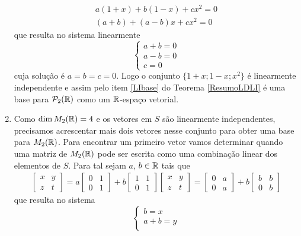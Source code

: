 \begin{exemplos}
\begin{exemplos}
\begin{solucao}
\begin{enumerate}
        \begin{align*}
          a(1 + x) + b(1 - x) + cx^2 = 0\\
          (a + b) + (a - b)x + cx^2 = 0
        \end{align*}
        que resulta no sistema linearmente
        \[
          \begin{cases}
            a + b = 0\\
            a - b = 0\\
            c = 0
          \end{cases}
        \]
        cuja solução é $a = b = c = 0$. Logo o conjunto $\{1 + x; 1 - x; x^2\}$ é linearmente independente e assim pelo item \ref{LIbase} do Teorema \ref{ResumoLDLI} é uma base para $\mathcal{P}_2(\mathbb{R})$ como um $\mathbb{R}$-espaço vetorial.

      \item Como $\dim M_2(\mathbb{R}) = 4$ e os vetores em $S$ são linearmente independentes, precisamos acrescentar mais dois vetores nesse conjunto para obter uma base para $M_2(\mathbb{R})$. Para encontrar um primeiro vetor vamos determinar quando uma matriz de $M_2(\mathbb{R})$ pode ser escrita como uma combinação linear dos elementos de $S$. Para tal sejam $a$, $b \in \mathbb{R}$ tais que
        \begin{align*}
          \begin{bmatrix}x & y\\z & t\end{bmatrix} = a\begin{bmatrix} 0 & 1\\0 & 1\end{bmatrix} + b\begin{bmatrix} 1 & 1\\0 & 1\end{bmatrix} 
          \begin{bmatrix}x & y\\z & t\end{bmatrix} = \begin{bmatrix} 0 & a\\0 & a\end{bmatrix} + b\begin{bmatrix} b & b\\0 & b\end{bmatrix} 
        \end{align*}
        que resulta no sistema
        \[
          \begin{cases}
            b = x\\
            a + b = y\\

\end{cases}\]
\end{enumerate}
\end{solucao}
\end{exemplos}
\end{exemplos}
